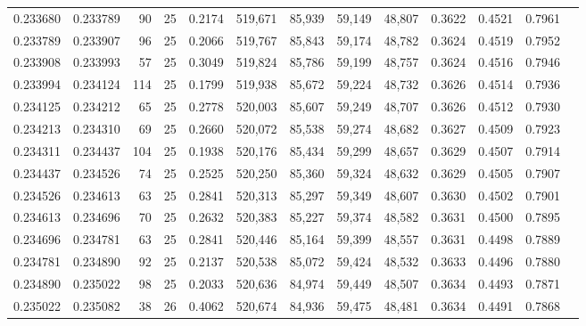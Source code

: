 \begin{tabular}{rrrrrrrrrrrrr}
0.233680 & 0.233789 &    90 &  25 &                                     0.2174 & 519,671 &  85,939 &  59,149 &  48,807 & 0.3622 & 0.4521 & 0.7961 \\
0.233789 & 0.233907 &    96 &  25 &                                     0.2066 & 519,767 &  85,843 &  59,174 &  48,782 & 0.3624 & 0.4519 & 0.7952 \\
0.233908 & 0.233993 &    57 &  25 &                                     0.3049 & 519,824 &  85,786 &  59,199 &  48,757 & 0.3624 & 0.4516 & 0.7946 \\
0.233994 & 0.234124 &   114 &  25 &                                     0.1799 & 519,938 &  85,672 &  59,224 &  48,732 & 0.3626 & 0.4514 & 0.7936 \\
0.234125 & 0.234212 &    65 &  25 &                                     0.2778 & 520,003 &  85,607 &  59,249 &  48,707 & 0.3626 & 0.4512 & 0.7930 \\
0.234213 & 0.234310 &    69 &  25 &                                     0.2660 & 520,072 &  85,538 &  59,274 &  48,682 & 0.3627 & 0.4509 & 0.7923 \\
0.234311 & 0.234437 &   104 &  25 &                                     0.1938 & 520,176 &  85,434 &  59,299 &  48,657 & 0.3629 & 0.4507 & 0.7914 \\
0.234437 & 0.234526 &    74 &  25 &                                     0.2525 & 520,250 &  85,360 &  59,324 &  48,632 & 0.3629 & 0.4505 & 0.7907 \\
0.234526 & 0.234613 &    63 &  25 &                                     0.2841 & 520,313 &  85,297 &  59,349 &  48,607 & 0.3630 & 0.4502 & 0.7901 \\
0.234613 & 0.234696 &    70 &  25 &                                     0.2632 & 520,383 &  85,227 &  59,374 &  48,582 & 0.3631 & 0.4500 & 0.7895 \\
0.234696 & 0.234781 &    63 &  25 &                                     0.2841 & 520,446 &  85,164 &  59,399 &  48,557 & 0.3631 & 0.4498 & 0.7889 \\
0.234781 & 0.234890 &    92 &  25 &                                     0.2137 & 520,538 &  85,072 &  59,424 &  48,532 & 0.3633 & 0.4496 & 0.7880 \\
0.234890 & 0.235022 &    98 &  25 &                                     0.2033 & 520,636 &  84,974 &  59,449 &  48,507 & 0.3634 & 0.4493 & 0.7871 \\
0.235022 & 0.235082 &    38 &  26 &                                     0.4062 & 520,674 &  84,936 &  59,475 &  48,481 & 0.3634 & 0.4491 & 0.7868 \\

\end{tabular}
